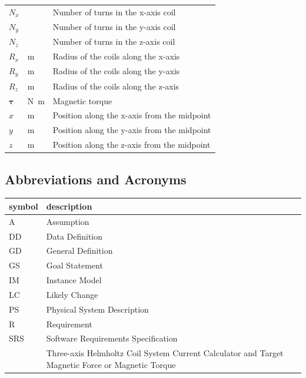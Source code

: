 \documentclass[12pt]{article}
\begin{document}
\begin{longtable*}{l l p{12cm}}
$N_x$ & & Number of turns in the x-axis coil \\
$N_y$ & & Number of turns in the y-axis coil \\
$N_z$ & & Number of turns in the z-axis coil \\
$R_x$ & \si[per-mode=symbol]{\metre} & Radius of the coils along the x-axis \\
$R_y$ & \si[per-mode=symbol]{\metre} & Radius of the coils along the y-axis \\
$R_z$ & \si[per-mode=symbol]{\metre} & Radius of the coils along the z-axis \\
$\mathbf{\tau}$ & \si[per-mode=symbol]{\si{\newton\meter}} & Magnetic torque \\
$x$ & \si[per-mode=symbol]{\metre} & Position along the x-axis from the midpoint \\
$y$ & \si[per-mode=symbol]{\metre} & Position along the y-axis from the midpoint \\
$z$ & \si[per-mode=symbol]{\metre} & Position along the z-axis from the midpoint \\

\bottomrule
\end{longtable*}


\subsection{Abbreviations and Acronyms}

\renewcommand{\arraystretch}{1.2}
\begin{tabular}{lp{15cm}} 
  \toprule		
  \textbf{symbol} & \textbf{description}\\
  \midrule 
  A & Assumption\\
  DD & Data Definition\\
  GD & General Definition\\
  GS & Goal Statement\\
  IM & Instance Model\\
  LC & Likely Change\\
  PS & Physical System Description\\
  R & Requirement\\
  SRS & Software Requirements Specification\\
  \progname{} & Three-axis Helmholtz Coil System Current Calculator and Target Magnetic Force or Magnetic Torque\\
  \bottomrule
\end{tabular}\\
\end{document}
